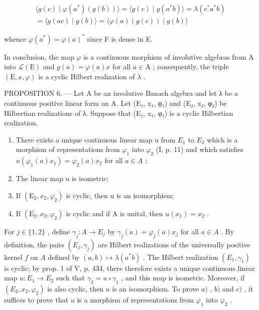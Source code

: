 \[
\begin{array}{c} \langle g (c) \mid \varphi (a ^ {*}) (g (b)) \rangle = \langle g (c) \mid g (a ^ {*} b) \rangle = \lambda (c ^ {*} a ^ {*} b) \\ = \langle g (a c) \mid g (b) \rangle = \langle \varphi (a) (g (c)) \mid g (b) \rangle \end{array}
\]

whence \(\varphi(a^{*})=\varphi(a)^{*}\) since F is dense in E.

In conclusion, the map \(\varphi\) is a continuous morphism of involutive algebras from A into \(\mathcal{L}(\mathrm{E})\) and \(g(a) = \varphi(a)x\) for all \(a \in \mathrm{A}\) ; consequently, the triple \((\mathrm{E}, x, \varphi)\) is a cyclic Hilbert realization of \(\lambda\) .

PROPOSITION 6. --- Let A be an involutive Banach algebra and let λ be a continuous positive linear form on A. Let (E₁, x₁, φ₁) and (E₂, x₂, φ₂) be Hilbertian realizations of λ. Suppose that (E₁, x₁, φ₁) is a cyclic Hilbertian realization.

\begin{enumerate}
\def\labelenumi{\alph{enumi})}
\item
  There exists a unique continuous linear map u from \(E_{1}\) to \(E_{2}\) which is a morphism of representations from \(\varphi_{1}\) into \(\varphi_{2}\) (I, p. 11) and which satisfies \(u(\varphi_{1}(a)x_{1}) = \varphi_{2}(a)x_{2}\) for all \(a \in A\) ;
\item
  The linear map u is isometric;
\item
  If \(\left(\mathrm{E}_{2},x_{2},\varphi_{2}\right)\) is cyclic, then u is an isomorphism;
\item
  If \(\left(\mathrm{E}_2,x_2,\varphi_2\right)\) is cyclic and if A is unital, then \(u(x_{1}) = x_{2}\) .
\end{enumerate}

For \(j \in \{1,2\}\) , define \(\gamma_j \colon A \to E_j\) by \(\gamma_j(a) = \varphi_j(a)x_j\) for all \(a \in A\) . By definition, the pairs \((E_j, \gamma_j)\) are Hilbert realizations of the universally positive kernel \(f\) on \(A\) defined by \((a,b) \mapsto \lambda(a^*b)\) . The Hilbert realization \((E_1, \gamma_1)\) is cyclic; by prop. 1 of V, p. 434, there therefore exists a unique continuous linear map \(u \colon E_1 \to E_2\) such that \(\gamma_2 = u \circ \gamma_1\) , and this map is isometric. Moreover, if \((E_2, x_2, \varphi_2)\) is also cyclic, then \(u\) is an isomorphism. To prove \(a)\) , \(b)\) and \(c)\) , it suffices to prove that \(u\) is a morphism of representations from \(\varphi_1\) into \(\varphi_2\) .

